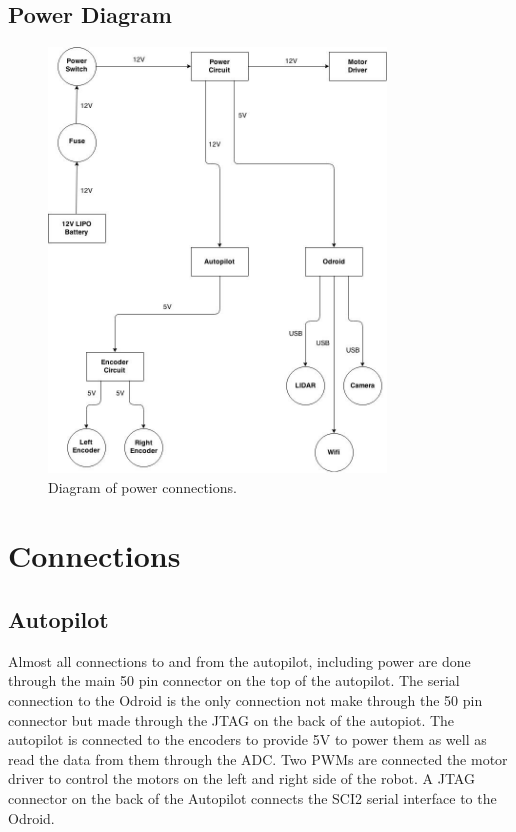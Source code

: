 \documentclass[letterpaper,12pt]{report}
\begin{document}
\section{Power Diagram}
\begin{figure}[h]
	\centering
	\includegraphics[width=0.8\textwidth]{powerdiag.jpg}
	\caption{Diagram of power connections.}
	\label{Figure 1:}
\end{figure}
\chapter{Connections}
\section{Autopilot}
Almost all connections to and from the autopilot, including power are done through the main 50 pin connector on the top of the autopilot. The serial connection to the Odroid is the only connection not make through the 50 pin connector but made through the JTAG on the back of the autopiot. The autopilot is connected to the encoders to provide 5V to power them as well as read the data from them through the ADC. Two PWMs are connected the motor driver to control the motors on the left and right side of the robot. A JTAG connector on the back of the Autopilot connects the SCI2 serial interface to the Odroid.
\end{document}
